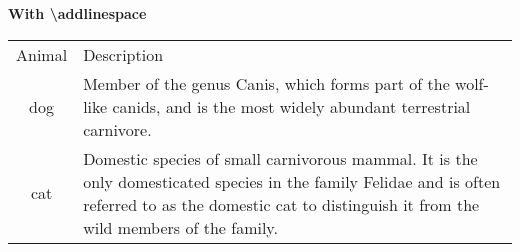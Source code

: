 \documentclass{article}
\begin{document}
\textbf{With \textbackslash addlinespace}

\begin{tabular}{cp{9cm}}
    Animal  & Description   \\
    dog     & Member of the genus Canis, which forms part of the wolf-like 
              canids, and is the most widely abundant terrestrial carnivore. \\
    \addlinespace
    cat     & Domestic species of small carnivorous mammal. It is the only
              domesticated species in the family Felidae and is often referred
              to as the domestic cat to distinguish it from the wild members of
              the family. \\
\end{tabular}
\end{document}
